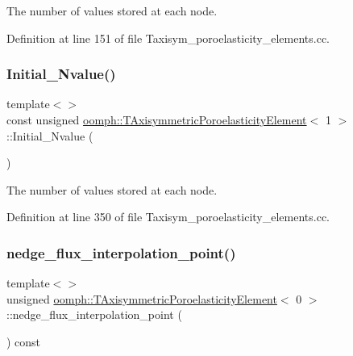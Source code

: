 The number of values stored at each node. 



Definition at line 151 of file Taxisym\+\_\+poroelasticity\+\_\+elements.\+cc.

\mbox{\label{classoomph_1_1TAxisymmetricPoroelasticityElement_a713b2c484b3c4a063a83557507a69400}} 
\subsubsection{\texorpdfstring{Initial\+\_\+\+Nvalue()}{Initial\_Nvalue()}\hspace{0.1cm}{\footnotesize\ttfamily [2/2]}}
{\footnotesize\ttfamily template$<$$>$ \\
const unsigned \hyperlink{classoomph_1_1TAxisymmetricPoroelasticityElement}{oomph\+::\+T\+Axisymmetric\+Poroelasticity\+Element}$<$ 1 $>$\+::Initial\+\_\+\+Nvalue (\begin{DoxyParamCaption}{ }\end{DoxyParamCaption})\hspace{0.3cm}{\ttfamily [private]}}



The number of values stored at each node. 



Definition at line 350 of file Taxisym\+\_\+poroelasticity\+\_\+elements.\+cc.

\mbox{\label{classoomph_1_1TAxisymmetricPoroelasticityElement_ac7e51a2a3dae948df106d34fe6fe6e29}} 
\subsubsection{\texorpdfstring{nedge\+\_\+flux\+\_\+interpolation\+\_\+point()}{nedge\_flux\_interpolation\_point()}\hspace{0.1cm}{\footnotesize\ttfamily [1/3]}}
{\footnotesize\ttfamily template$<$$>$ \\
unsigned \hyperlink{classoomph_1_1TAxisymmetricPoroelasticityElement}{oomph\+::\+T\+Axisymmetric\+Poroelasticity\+Element}$<$ 0 $>$\+::nedge\+\_\+flux\+\_\+interpolation\+\_\+point (\begin{DoxyParamCaption}{ }\end{DoxyParamCaption}) const\hspace{0.3cm}{\ttfamily [virtual]}}


